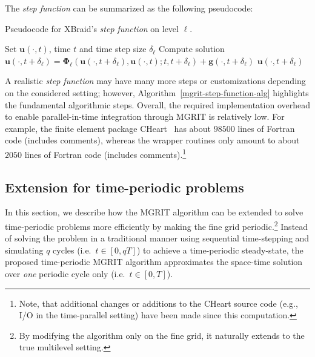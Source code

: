 \documentclass[3p]{elsarticle}
\begin{document}
The \emph{step function} can be summarized as the following pseudocode:
\FloatBarrier
\begin{algorithm}
    \caption{Pseudocode for XBraid's \emph{step function} on level $\ell$.}
    \label{mgrit-step-function-alg}
    \begin{algorithmic}[1]
            \State Set $\boldsymbol{u} (\cdot, t)$,
                time $t$ and time step size $\delta_\ell$
            \State Compute solution
                $\boldsymbol{u} (\cdot, t + \delta_\ell)
                = \boldsymbol{\Phi}_\ell \left( \boldsymbol{u} (\cdot, t + \delta_\ell), \boldsymbol{u} (\cdot, t); t, t + \delta_\ell \right)
                + \boldsymbol{g} (\cdot, t + \delta_\ell)$
            \State\Return $\boldsymbol{u} (\cdot, t + \delta_\ell)$
        \EndFunction
    \end{algorithmic}
\end{algorithm}
\FloatBarrier

A realistic \emph{step function} may have many more steps or customizations
depending on the considered setting; however, Algorithm~\ref{mgrit-step-function-alg} highlights
the fundamental algorithmic steps.
Overall, the required implementation overhead to enable parallel-in-time integration
through MGRIT is relatively low.
For example, the finite element package {CHeart}~\cite{LeeEtAl2016,CHeart}
has about $98500$ lines of Fortran code (includes comments),
whereas the wrapper routines only amount to about $2050$ lines of Fortran code (includes comments).\footnote{Note, that additional changes or additions to the {CHeart} source code (e.g., I/O in the time-parallel setting) have been made
since this computation.}
\subsection{Extension for time-periodic problems}
\label{mgrit-extension-for-time-periodic-problems-sec}
In this section, we describe how the MGRIT algorithm can be extended
to solve time-periodic problems more efficiently by making the fine grid periodic.\footnote{By modifying
the algorithm only on the fine grid, it naturally extends to the true multilevel setting.}
Instead of solving the problem in a traditional manner using sequential time-stepping
and simulating $q$ cycles (i.e.\ $t \in [0, q T]$) to achieve a time-periodic steady-state,
the proposed time-periodic MGRIT algorithm approximates the space-time solution
over \emph{one} periodic cycle only (i.e.\ $t \in [0, T]$).
\end{document}
